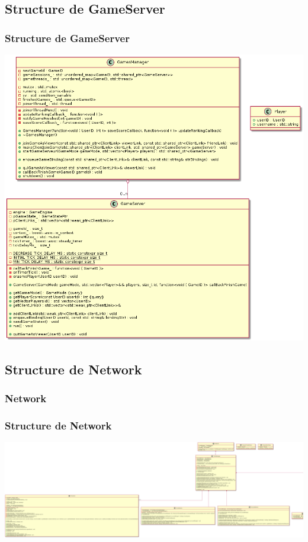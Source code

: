 \documentclass{beamer}
\begin{document}
\subsection{Structure de GameServer}
\begin{frame}
\frametitle{Structure de GameServer}

\includegraphics[width=1\textwidth]{../../res/uml/class/GameServerClass.png}
\end{frame}


\subsection{Structure de Network}


\subsubsection{Network}
\begin{frame}
\frametitle{Structure de Network}

\includegraphics[width=1\textwidth]{../../res/uml/class/NetworkClass.png}
\end{frame}
\end{document}
